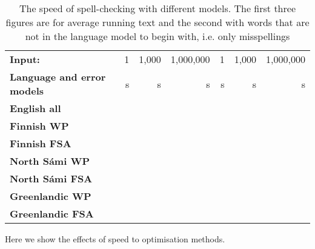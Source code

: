 \documentclass[a4paper,12pt]{article}
\begin{document}
\begin{table}
    \centering
    \begin{tabular}{|l|r|r|r||r|r|r|}
        \hline
        \bf Input: & 1 & 1,000 & 1,000,000 & 1 & 1,000 & 1,000,000 \\
        \bf Language and error models & s & s & s & s & s & s \\
        \hline
          \bf English all & & & & & & \\
        \hline
        \bf Finnish WP & & & & & & \\
       \bf Finnish FSA & & & & & & \\
        \hline
        \bf North Sámi WP & & & & & & \\
        \bf North Sámi FSA& & & & & & \\
        \hline
        \bf Greenlandic WP & & & & & & \\
       \bf Greenlandic FSA & & & & & & \\
        \hline
    \end{tabular}
    \caption{The speed of spell-checking with different models. The first three
    figures are for average running text and the second with words that are not
    in the language model to begin with, i.e. only
    misspellings\label{table:language-speed}}
\end{table}

Here we show the effects of speed to optimisation methods.
\end{document}
